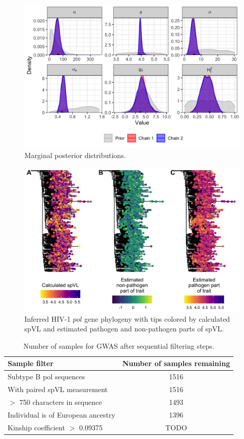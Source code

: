 \documentclass[]{article}
\begin{document}
\begin{doublespace}
\begin{figure}[H]
	\centering
		\includegraphics[width=\linewidth]{figures/poumm_parameter_estimates.png}
		\caption{Marginal posterior distributions.}
\label{fig:poumm-parameters}
\end{figure}

\begin{figure}
\includegraphics[width = 0.3\linewidth]{figures/spvl_on_tree.png}
	\caption{Inferred HIV-1 $pol$ gene phylogeny with tips colored by calculated spVL and estimated pathogen and non-pathogen parts of spVL.}
	\label{fig:spvl-on-tree}
\end{figure}

\begin{table}[H]
    \begin{center}
    \begin{tabular}{lc}
    \hline
    Sample filter & Number of samples remaining \\
    \hline
    Subtype B pol sequences & 1516 \\
    With paired spVL measurement & 1516 \\
    $>$ 750 characters in sequence & 1493 \\
    Individual is of European ancestry & 1396 \\
    Kinship coefficient $>$ 0.09375 & TODO \\ 
    \hline
    \end{tabular}
    \caption{Number of samples for GWAS after sequential filtering steps.}
    \label{tab:sample-filtering}
    \end{center}
\end{table}


\end{doublespace}
\end{document}
